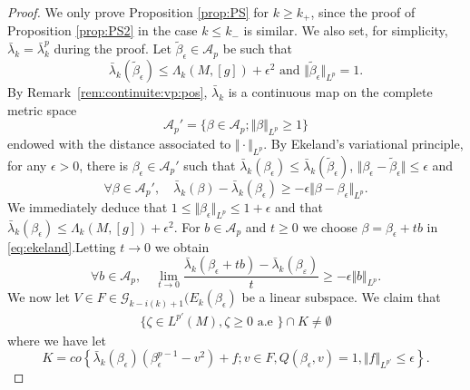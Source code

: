 \documentclass[10pt]{amsart}
\numberwithin{equation}{section}
\theoremstyle{plain}
\theoremstyle{remark}
\begin{document}
\begin{proof} We only prove Proposition \ref{prop:PS} for $k\geq k_+$, since the proof of Proposition \ref{prop:PS2} in the case $k \le k_{-}$ is similar. We also set, for simplicity, $\bar{\lambda}_k = \bar{\lambda}_k^p$ during the proof. Let $\tilde{\beta}_\epsilon \in \mathcal{A}_p$ be such that 
$$ \bar{\lambda}_k(\tilde{\beta}_{\epsilon}) \leq  \Lambda_k(M,[g]) + \epsilon^2 \text{ and } \Vert \tilde{\beta}_\epsilon \Vert_{L^p} = 1. $$
By Remark~\ref{rem:continuite:vp:pos}, $\bar{\lambda}_k$ is a continuous map on the complete metric space 
$$\mathcal{A}_p' = \{ \beta \in \mathcal{A}_p ; \Vert \beta \Vert_{L^p}\geq 1 \}$$
endowed with the distance associated to $\Vert \cdot \Vert_{L^p}$. %
By Ekeland's variational principle, for any $\epsilon >0$, there is $\beta_\epsilon \in \mathcal{A}_p'$ such that $ \bar{\lambda}_k(\beta_{\epsilon}) \leq \bar{\lambda}_k(\tilde{\beta}_{\epsilon})$, $ \Vert \beta_{\epsilon} - \tilde{\beta}_{\epsilon} \Vert \leq \epsilon$ and 
\begin{equation} \label{eq:ekeland} \forall \beta \in \mathcal{A}_p', \quad  \bar{\lambda}_k(\beta) - \bar{\lambda}_k(\beta_\epsilon) \geq - \epsilon\Vert \beta-\beta_\epsilon \Vert_{L^p} .\end{equation}
We immediately deduce that $1 \leq \Vert \beta_\epsilon \Vert_{L^p} \leq 1 +\epsilon$ and that $\bar{\lambda}_k(\beta_{\epsilon}) \leq  \Lambda_k(M,[g]) + \epsilon^2$.
For $b \in \mathcal{A}_p$ and $t \ge 0$ we choose $\beta = \beta_\epsilon + t b$ in  \eqref{eq:ekeland}.Letting $t \to 0$ we obtain
\begin{equation}\label{eq:ekelandderivative}\forall b \in \mathcal{A}_p, \quad \lim_{t\to 0} \frac{\bar{\lambda}_k(\beta_\epsilon+tb)- \bar{\lambda}_k(\beta_\varepsilon)}{t} \geq - \epsilon \Vert b \Vert_{L^p}.\end{equation}
We now let $V \in F \in \mathcal{G}_{k - i(k) + 1}(E_k(\beta_{\epsilon})$ be a linear subspace. We claim that 
\begin{equation} \label{eq:HBnonemptyekeland}
\begin{split}  \{ \zeta \in L^{p'}(M) , \zeta \geq 0 \text{ a.e } \} \cap  K \neq \emptyset
\end{split} \end{equation}
where we have let 
$$ K = %
co \left\{ \bar{\lambda}_k(\beta_{\epsilon}) \left( \beta_{\epsilon}^{p-1} - v^2 \right) + f ; v \in F, Q(\beta_{\epsilon},v) = 1, \Vert f \Vert_{L^{p'}} \leq \epsilon \right\}. $$

\end{proof}
\end{document}
